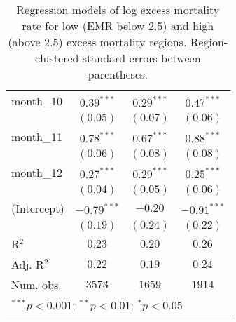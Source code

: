 \begin{table}[h!]
\begin{center}
\begin{small}
\begin{tabular}{l c c c}
month\_10      & $0.39^{***}$  & $0.29^{***}$  & $0.47^{***}$  \\
               & $(0.05)$      & $(0.07)$      & $(0.06)$      \\
month\_11      & $0.78^{***}$  & $0.67^{***}$  & $0.88^{***}$  \\
               & $(0.06)$      & $(0.08)$      & $(0.08)$      \\
month\_12      & $0.27^{***}$  & $0.29^{***}$  & $0.25^{***}$  \\
               & $(0.04)$      & $(0.05)$      & $(0.06)$      \\
(Intercept)    & $-0.79^{***}$ & $-0.20$       & $-0.91^{***}$ \\
               & $(0.19)$      & $(0.24)$      & $(0.22)$      \\
\hline
R$^2$          & $0.23$        & $0.20$        & $0.26$        \\
Adj. R$^2$     & $0.22$        & $0.19$        & $0.24$        \\
Num. obs.      & $3573$        & $1659$        & $1914$        \\
\hline
\multicolumn{4}{l}{\tiny{$^{***}p<0.001$; $^{**}p<0.01$; $^{*}p<0.05$}}
\end{tabular}
\end{small}
\caption{Regression models of log excess mortality rate for low (EMR below 2.5) and high (above 2.5) excess mortality regions. Region-clustered standard errors between parentheses.}
\label{tab:hilomodels}
\end{center}
\end{table}
